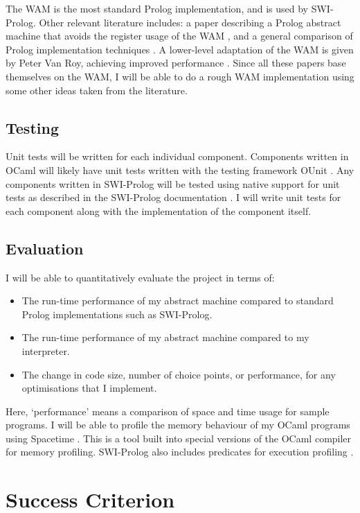 \documentclass[12pt, a4paper]{article}
\begin{document}
 The WAM is the most standard Prolog implementation, and is used by SWI-Prolog. Other relevant literature includes: a paper describing a Prolog abstract machine that avoids the register usage of the WAM \cite{regFree}, and a general comparison of Prolog implementation techniques \cite{impProg}. A lower-level adaptation of the WAM is given by Peter Van Roy, achieving improved performance \cite{fastProlog}. Since all these papers base themselves on the WAM, I will be able to do a rough WAM implementation using some other ideas taken from the literature.


\subsection*{Testing}

Unit tests will be written for each individual component. Components written in OCaml will likely have unit tests written with the testing framework OUnit \cite{OUnit}. Any components written in SWI-Prolog will be tested using native support for unit tests as described in the SWI-Prolog documentation \cite{PUnit}. I will write unit tests for each component along with the implementation of the component itself.

\subsection*{Evaluation}

I will be able to quantitatively evaluate the project in terms of:
\begin{itemize}
\item The run-time performance of my abstract machine compared to standard Prolog implementations such as SWI-Prolog.
\item The run-time performance of my abstract machine compared to my interpreter.
\item The change in code size, number of choice points, or performance, for any optimisations that I implement.
\end{itemize}
Here, `performance' means a comparison of space and time usage for sample programs. I will be able to profile the memory behaviour of my OCaml programs using Spacetime \cite{SpaceT}. This is a tool built into special versions of the OCaml compiler for memory profiling. SWI-Prolog also includes predicates for execution profiling \cite{PExec}.

\section*{Success Criterion}
\end{document}
